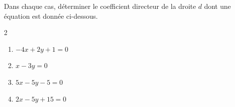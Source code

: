 \begin{exo}{}
	Dans chaque cas, déterminer le coefficient directeur de la droite $d$ dont une équation est donnée ci-dessous.

	\vspace*{-2mm}\begin{multicols}{2}
		\begin{enumerate}
			\item $-4x + 2y + 1 = 0$
			\item $x - 3y = 0$
			\item $5x - 5y - 5 = 0$
			\item $2x - 5y + 15 = 0$
		\end{enumerate}
	\end{multicols}
\end{exo}
